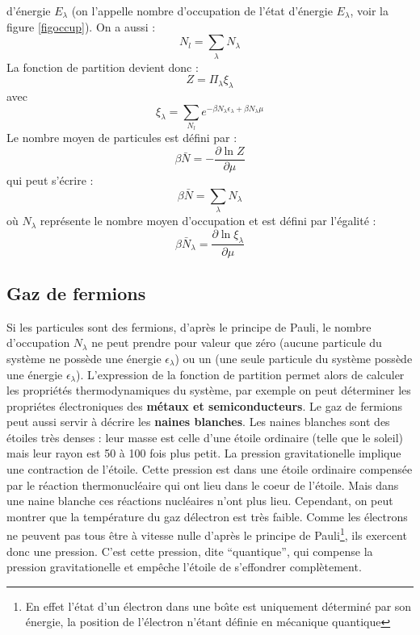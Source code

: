\documentclass[12pt]{book}
\begin{document}
d'\'energie $E_\lambda$ (on l'appelle nombre d'occupation de l'\'etat
d'\'energie $E_\lambda$, voir la figure \ref{figoccup}). On a aussi :
\begin{equation}
N_l=\sum_\lambda N_\lambda
\end{equation}
La fonction de partition devient donc :
\begin{equation}
Z=\Pi_\lambda \xi_\lambda
\end{equation}
avec 
\begin{equation}
\xi_\lambda=\sum_{N_l}e^{-\beta N_\lambda\epsilon_\lambda+\beta
N_\lambda\mu} 
\end{equation}
Le nombre moyen de particules est d\'efini par :
\begin{equation}
\beta \bar N=-\frac{\partial \ln Z}{\partial \mu}
\end{equation}
qui peut s'\'ecrire :
\begin{equation}
\beta \bar N=\sum_\lambda N_\lambda
\end{equation}
o\`u $N_\lambda$ repr\'esente le  nombre moyen d'occupation et est
d\'efini par l'\'egalit\'e : 
\begin{equation}
\beta \bar N_\lambda=\frac{\partial \ln \xi_\lambda}{\partial \mu}
\end{equation}

\subsection{Gaz de fermions}
Si les particules sont des fermions, d'apr\`es le
principe de Pauli,
le nombre d'occupation $N_\lambda$ ne peut prendre pour valeur que
z\'ero (aucune particule du syst\`eme ne poss\`ede une \'energie
$\epsilon_\lambda$) ou un (une seule particule du syst\`eme 
poss\`ede une \'energie $\epsilon_\lambda$).
L'expression de la fonction de partition permet alors de calculer les
propri\'et\'es thermodynamiques du syst\`eme, par exemple on peut
d\'eterminer les propri\'etes \'electroniques des {\bf m\'etaux et
semiconducteurs}\cite{ph:physt:Diu89}. Le gaz de fermions peut aussi
servir \`a d\'ecrire les {\bf naines blanches}.
Les naines 
blanches\cite{ph:physt:Diu89} sont des 
\'etoiles tr\`es denses : leur masse est celle d'une \'etoile ordinaire
(telle que le soleil) mais leur rayon est 50 \`a 100 fois plus petit.
La pression gravitationelle implique une contraction de l'\'etoile.
Cette pression est dans une \'etoile ordinaire compens\'ee par le
r\'eaction thermonucl\'eaire qui ont lieu dans le coeur de l'\'etoile.
Mais dans une naine blanche ces r\'eactions nucl\'eaires n'ont plus
lieu. Cependant, on peut montrer que la temp\'erature du gaz
d\'electron est tr\`es 
faible. Comme les \'electrons ne peuvent pas tous \^etre \`a
vitesse nulle d'apr\`es le principe de Pauli\footnote{En effet
l'\'etat d'un \'electron dans une 
bo\^\i te est 
uniquement d\'etermin\'e par son \'energie, la position de
l'\'electron n'\'etant d\'efinie en m\'ecanique quantique}, ils exercent
donc une pression. C'est cette pression, dite  ``quantique'', qui
compense la pression gravitationelle et emp\^eche l'\'etoile de
s'effondrer compl\`etement.
\end{document}
